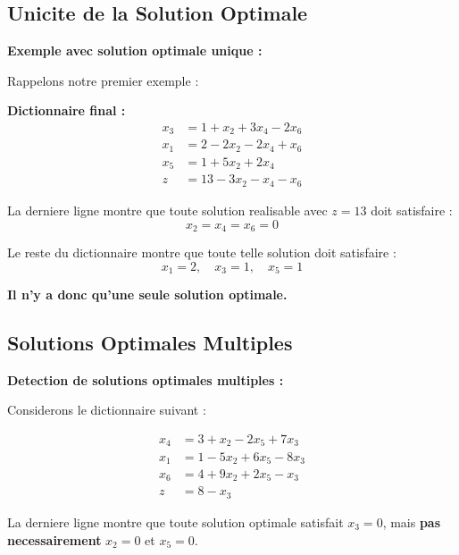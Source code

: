 \documentclass[12pt,a4paper]{article}
\begin{document}
\newpage
\subsection{Unicite de la Solution Optimale}

\begin{exemple}
\textbf{Exemple avec solution optimale unique :}

Rappelons notre premier exemple :

\textbf{Dictionnaire final :}
\begin{align*}
x_3 &= 1 + x_2 + 3x_4 - 2x_6\\
x_1 &= 2 - 2x_2 - 2x_4 + x_6\\
x_5 &= 1 + 5x_2 + 2x_4\\
z &= 13 - 3x_2 - x_4 - x_6
\end{align*}

La derniere ligne montre que toute solution realisable avec $z = 13$ doit satisfaire :
$$x_2 = x_4 = x_6 = 0$$

Le reste du dictionnaire montre que toute telle solution doit satisfaire :
$$x_1 = 2, \quad x_3 = 1, \quad x_5 = 1$$

\textcolor{defvert}{\textbf{Il n'y a donc qu'une seule solution optimale.}}
\end{exemple}

\newpage
\subsection{Solutions Optimales Multiples}

\begin{definition}
\textbf{Detection de solutions optimales multiples :}

Considerons le dictionnaire suivant :

\begin{align*}
x_4 &= 3 + x_2 - 2x_5 + 7x_3\\
x_1 &= 1 - 5x_2 + 6x_5 - 8x_3\\
x_6 &= 4 + 9x_2 + 2x_5 - x_3\\
z &= 8 - x_3
\end{align*}

La derniere ligne montre que toute solution optimale satisfait $x_3 = 0$, mais \textcolor{importantrouge}{\textbf{pas necessairement}} $x_2 = 0$ et $x_5 = 0$.
\end{definition}
\end{document}
